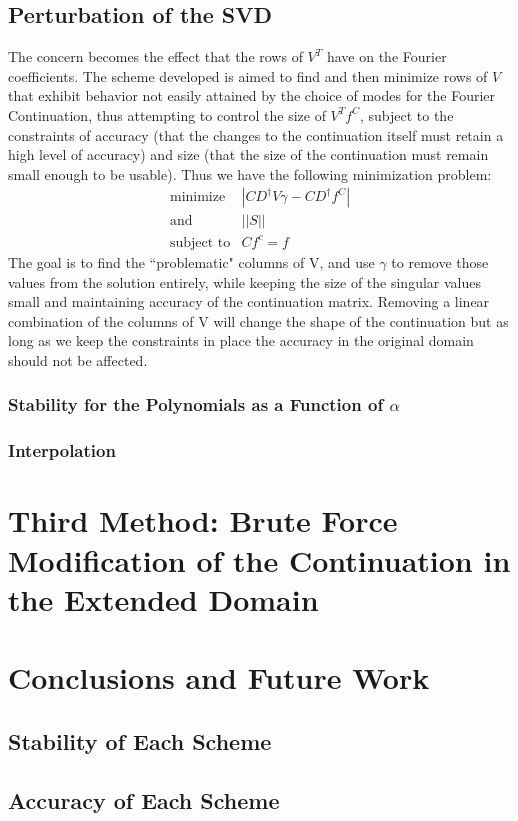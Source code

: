 \documentclass[11pt]{amsart}
\begin{document}
\subsection{Perturbation of the SVD}
The concern becomes the effect that the rows of $V^T$ have on the Fourier coefficients.  The scheme developed is aimed to find and then minimize rows of $V$ that exhibit behavior not easily attained by the choice of modes for the Fourier Continuation, thus attempting to control the size of $V^Tf^C$, subject to the constraints of accuracy (that the changes to the continuation itself must retain a high level of accuracy) and size (that the size of the continuation must remain small enough to be usable).  
Thus we have the following minimization problem: 
\begin{eqnarray}
\text{minimize} & |CD^{\dag}V\gamma - C D^{\dag}f^C| \\
\text{and} & ||S|| \\
\text{subject to} & Cf^c = f
\end{eqnarray}
The goal is to find the ``problematic" columns of V, and use $\gamma$ to remove those values from the solution entirely, while keeping the size of the singular values small and maintaining accuracy of the continuation matrix. 
Removing a linear combination of the columns of V will change the shape of the continuation but as long as we keep the constraints in place the accuracy in the original domain should not be affected. 
\subsubsection{Stability for the Polynomials as a Function of $\alpha$}
%
%
%
\subsubsection{Interpolation}
%
%
%
\section{Third Method: Brute Force Modification of the Continuation in the Extended Domain}


\section{Conclusions and Future Work}
\subsection{Stability of Each Scheme}
\subsection{Accuracy of Each Scheme}
%
%
%
\end{document}
